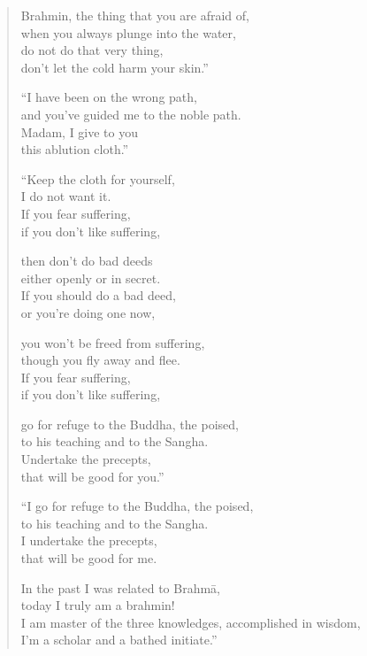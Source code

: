 \documentclass[12pt,openany]{book}%
\begin{document}
\begin{verse}
Brahmin, the thing that you are afraid of, \\
when you always plunge into the water, \\
do not do that very thing, \\
don’t let the cold harm your skin.” 

“I have been on the wrong path, \\
and you’ve guided me to the noble path. \\
Madam, I give to you \\
this ablution cloth.” 

“Keep the cloth for yourself, \\
I do not want it. \\
If you fear suffering, \\
if you don’t like suffering, 

then don’t do bad deeds \\
either openly or in secret. \\
If you should do a bad deed, \\
or you’re doing one now, 

you won’t be freed from suffering, \\
though you fly away and flee. \\
If you fear suffering, \\
if you don’t like suffering, 

go for refuge to the Buddha, the poised, \\
to his teaching and to the Sangha. \\
Undertake the precepts, \\
that will be good for you.” 

“I go for refuge to the Buddha, the poised, \\
to his teaching and to the Sangha. \\
I undertake the precepts, \\
that will be good for me. 

In the past I was related to \textsanskrit{Brahmā}, \\
today I truly am a brahmin! \\
I am master of the three knowledges, accomplished in wisdom, \\
I’m a scholar and a bathed initiate.” 

%
\end{verse}
\end{document}
